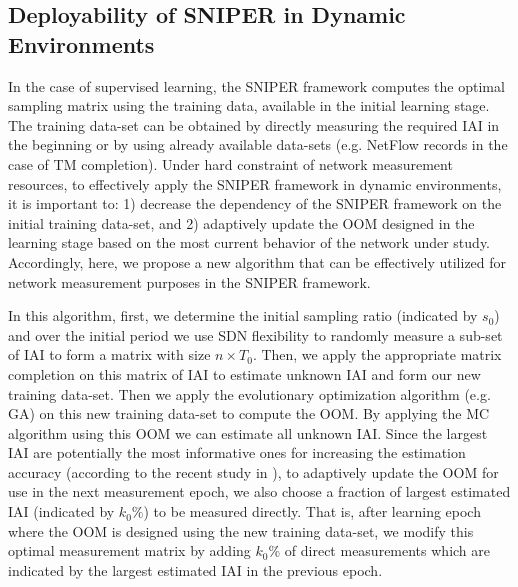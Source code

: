 \subsection{Deployability of SNIPER in Dynamic Environments}
In the case of supervised learning, the SNIPER framework computes the optimal sampling matrix using the training data, available in the initial learning stage. The training data-set can be obtained by directly measuring the required IAI in the beginning or by using already available data-sets (e.g. NetFlow records in the case of TM completion). Under hard constraint of network measurement resources, to effectively apply the SNIPER framework in dynamic environments, it is important to: 1) decrease the dependency of the SNIPER framework on the initial training data-set, and 2) adaptively update the OOM designed in the learning stage based on the most current behavior of the network under study. Accordingly, here, we propose a new algorithm that can be effectively utilized for network measurement purposes in the SNIPER framework. 

In this algorithm, first, we determine the initial sampling ratio (indicated by $s_{0}$) and over the initial period we use SDN flexibility to randomly measure a sub-set of IAI to form a matrix with size $n \times T_{0}$. Then, we apply the appropriate matrix completion on this matrix of IAI to estimate unknown IAI and form our new training data-set. Then we apply the evolutionary optimization algorithm (e.g. GA) on this new training data-set to compute the OOM. By applying the MC algorithm using this OOM we can estimate all unknown IAI. Since the largest IAI are potentially the most informative ones for increasing the estimation accuracy (according to the recent study in \cite{IF14iSTAMP:2014}), to adaptively update the OOM for use in the next measurement epoch, we also choose a fraction of largest estimated IAI (indicated by $k_{0}\%$) to be measured directly. That is, after learning epoch where the OOM is designed using the new training data-set, we modify this optimal measurement matrix by adding $k_{0}\%$ of direct measurements which are indicated by the largest estimated IAI in the previous epoch. 

